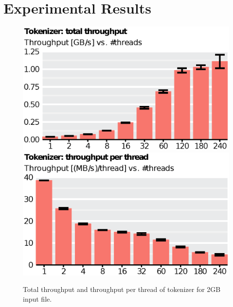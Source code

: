 
\section{Experimental Results}\label{sec:exp}

\begin{figure}
    \includegraphics[scale=.45]{img/def/tokenizer_tp_total.eps}
    \includegraphics[scale=.45]{img/def/tokenizer_tp_per_thread.eps}
    \caption{Total throughput and throughput per thread of tokenizer
    for 2GB input file.}
    \label{fig:tokenizertp}
\end{figure}

